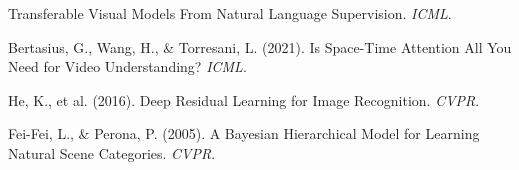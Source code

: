 \documentclass[12pt,a4paper]{report}
\begin{document}
\begin{enumerate}[itemsep=2pt, label={[\arabic*]}]
          Transferable Visual Models From Natural Language Supervision.
          \textit{ICML}.
    \item \label{bertasius2021timesformer} Bertasius, G., Wang, H., \&
          Torresani, L. (2021). Is Space-Time Attention All You Need for
          Video Understanding? \textit{ICML}.
    \item \label{he2016resnet} He, K., et al. (2016). Deep Residual Learning
          for Image Recognition. \textit{CVPR}.
    \item \label{fei2006bow} Fei-Fei, L., \& Perona, P. (2005). A Bayesian
          Hierarchical Model for Learning Natural Scene Categories.
          \textit{CVPR}.
\end{enumerate}
\end{document}
